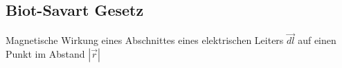 \subsection{Biot-Savart Gesetz} \label{sec_biot_savart}
    Magnetische Wirkung eines Abschnittes eines elektrischen Leiters $\vec{dl}$ auf einen Punkt im Abstand $\left|\vec{r}\right|$   
